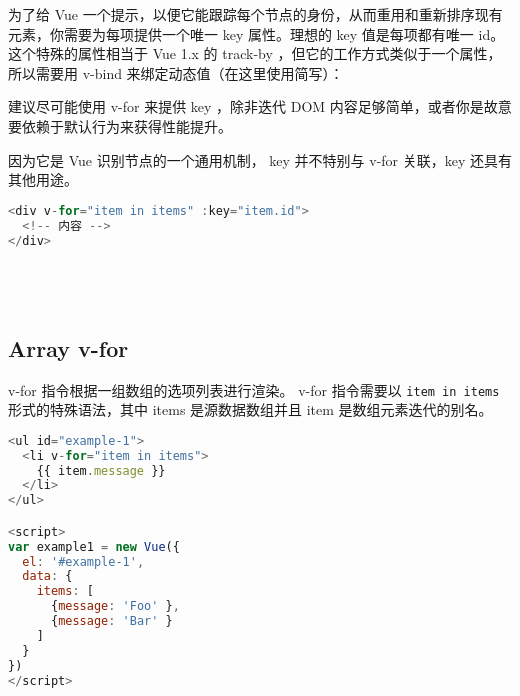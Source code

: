 为了给 Vue 一个提示，以便它能跟踪每个节点的身份，从而重用和重新排序现有元素，你需要为每项提供一个唯一 key 属性。理想的 key 值是每项都有唯一 id。这个特殊的属性相当于 Vue 1.x 的 track-by ，但它的工作方式类似于一个属性，所以需要用 v-bind 来绑定动态值（在这里使用简写）：

建议尽可能使用 v-for 来提供 key ，除非迭代 DOM 内容足够简单，或者你是故意要依赖于默认行为来获得性能提升。


因为它是 Vue 识别节点的一个通用机制， key 并不特别与 v-for 关联，key 还具有其他用途。

\begin{lstlisting}[language=JavaScript]
<div v-for="item in items" :key="item.id">
  <!-- 内容 -->
</div>
\end{lstlisting}



\begin{lstlisting}[language=JavaScript]

\end{lstlisting}




\begin{lstlisting}[language=JavaScript]

\end{lstlisting}



\begin{lstlisting}[language=JavaScript]

\end{lstlisting}



\begin{lstlisting}[language=JavaScript]

\end{lstlisting}




\subsection{Array v-for}

v-for 指令根据一组数组的选项列表进行渲染。 v-for 指令需要以 \texttt{item in items}形式的特殊语法，其中 items 是源数据数组并且 item 是数组元素迭代的别名。

\begin{lstlisting}[language=JavaScript]
<ul id="example-1">
  <li v-for="item in items">
    {{ item.message }}
  </li>
</ul>

<script>
var example1 = new Vue({
  el: '#example-1',
  data: {
    items: [
      {message: 'Foo' },
      {message: 'Bar' }
    ]
  }
})
</script>
\end{lstlisting}

